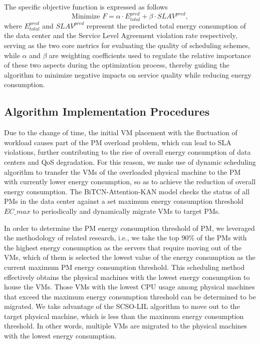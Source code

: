 \documentclass[conference]{{IEEEtran}}
\begin{document}
The specific objective function is expressed as follows
\begin{equation}
    \text{Minimize } F = \alpha \cdot E_{total}^{pred} + \beta \cdot SLAV^{pred},
    \label{eq:fitness_function}
\end{equation}
where $E^{pred}_{total}$ and $SLAV^{pred}$ represent the predicted total energy consumption of the data center and the Service Level Agreement violation rate respectively, serving as the two core metrics for evaluating the quality of scheduling schemes, while $\alpha$ and $\beta$ are weighting coefficients used to regulate the relative importance of these two aspects during the optimization process, thereby guiding the algorithm to minimize negative impacts on service quality while reducing energy consumption.

\subsection{Algorithm Implementation Procedures}

Due to the change of time, the initial VM placement with the fluctuation of workload causes part of the PM overload problem, which can lead to SLA violations, further contributing to the rise of overall energy consumption of data centers and QoS degradation. For this reason, we make use of dynamic scheduling algorithm to transfer the VMs of the overloaded physical machine to the PM with currently lower energy consumption, so as to achieve the reduction of overall energy consumption. The BiTCN-Attention-KAN model checks the status of all PMs in the data center against a set maximum energy consumption threshold $EC\_{max}$ to periodically and dynamically migrate VMs to target PMs.

In order to determine the PM energy consumption threshold of PM, we leveraged the methodology of related research, i.e., we take the top 90\% of the PMs with the highest energy consumption as the servers that require moving out of the VMs, which of them is selected the lowest value of the energy consumption as the current maximum PM energy consumption threshold. This scheduling method effectively obtains the physical machines with the lowest energy consumption to house the VMs. Those VMs with the lowest CPU usage among physical machines that exceed the maximum energy consumption threshold can be determined to be migrated. We take advantage of the SCSO-LIL algorithm to move out to the target physical machine, which is less than the maximum energy consumption threshold. In other words, multiple VMs are migrated to the physical machines with the lowest energy consumption.
\end{document}
